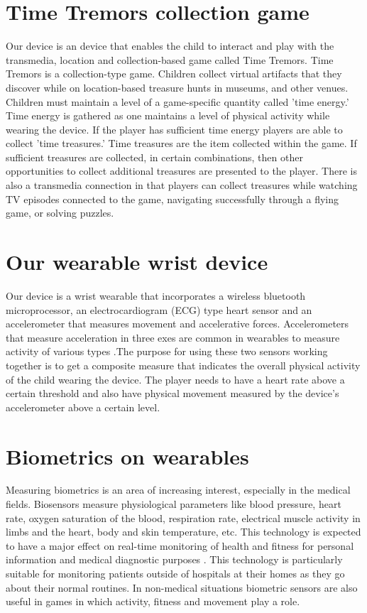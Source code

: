 \documentclass{SIGCHI2015LaTex/sigchi}
\begin{document}
\section{Time Tremors collection game}
Our device is an device that enables the child to interact and play with the transmedia, location and collection-based game called Time Tremors. Time Tremors is a collection-type game. Children collect virtual artifacts that they discover while on location-based treasure hunts in museums, and other venues. Children must maintain a level of a game-specific quantity called 'time energy.' Time energy is gathered as one maintains a level of physical activity while wearing the device. If the player has sufficient time energy players are able to collect 'time treasures.' Time treasures are the item collected within the game. If sufficient treasures are collected, in certain combinations, then other opportunities to collect additional treasures are presented to the player. There is also a transmedia connection in that players can collect treasures while watching TV episodes connected to the game, navigating successfully through a flying game, or solving puzzles.

\section{Our wearable wrist device}
Our device is a wrist wearable that incorporates a wireless bluetooth microprocessor, an electrocardiogram (ECG) type heart sensor and an accelerometer that measures movement and accelerative forces. Accelerometers that measure acceleration in three exes are common in wearables to measure activity of various types \cite{alshurafa2014designing}.The purpose for using these two sensors working together is to get a composite measure that indicates the overall physical activity of the child wearing the device. The player needs to have a heart rate above a certain threshold and also have physical movement measured by the device's accelerometer above a certain level. 

\section{Biometrics on wearables}
Measuring biometrics is an area of increasing interest, especially in the medical fields. Biosensors measure physiological parameters like blood pressure, heart rate, oxygen saturation of the blood, respiration rate, electrical muscle activity in limbs and the heart, body and skin temperature, etc. This technology is expected to have a major effect on real-time monitoring of health and fitness for personal information and medical diagnostic purposes  \cite{pantelopoulos2010survey}. This technology is particularly suitable for monitoring patients outside of hospitals at their homes as they go about their normal routines. In non-medical situations biometric sensors are also useful in games in which activity, fitness and movement play a role.  
\end{document}
